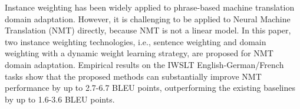 Instance weighting has been widely applied to phrase-based machine translation domain adaptation. However, it is challenging to be applied to Neural Machine Translation (NMT) directly, because NMT is not a linear model. In this paper, two instance weighting technologies, i.e., sentence weighting and domain weighting with a dynamic weight learning strategy, are proposed for NMT domain adaptation. Empirical results on the IWSLT English-German/French tasks show that the proposed methods can substantially improve NMT performance by up to 2.7-6.7 BLEU points, outperforming the existing baselines by up to 1.6-3.6 BLEU points.
